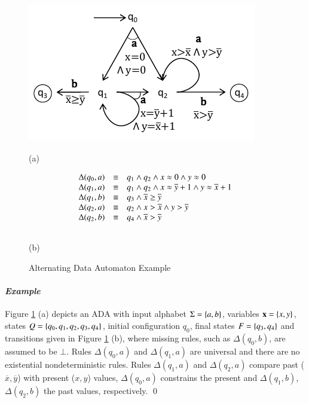 \documentclass[10pt]{llncs}
\begin{document}
\begin{figure}[htb]
\begin{center}
\begin{minipage}{6cm}
\centerline{\includegraphics[scale=0.8]{Example.pdf}}
\centerline{(a)}
\end{minipage}
\begin{minipage}{6cm}
\[\begin{array}{rcl}
\Delta(q_0,a) & \equiv & q_1 \wedge q_2 \wedge x\approx0 \wedge y\approx0 \\
\Delta(q_1,a) & \equiv & q_1 \wedge q_2 \wedge x\approx\overline{y}+1 \wedge y\approx\overline{x}+1 \\
\Delta(q_1,b) & \equiv & q_3 \wedge \overline{x} \geq \overline{y} \\
\Delta(q_2,a) & \equiv & q_2 \wedge x > \overline{x} \wedge y > \overline{y} \\
\Delta(q_2,b) & \equiv & q_4 \wedge \overline{x}>\overline{y} \\\\
\end{array}\]
\centerline{(b)}
\end{minipage}
\end{center}
\caption{Alternating Data Automaton Example}
\label{fig:ex}
\end{figure}

\paragraph{\em Example}
Figure \ref{fig:ex} (a) depicts an ADA with input alphabet $\Sigma =
\left\{ a,b \right\}$, variables $\mathbf x = \left\{ x,y \right\}$, states $Q =
\left\{ q_0,q_1,q_2,q_3,q_4 \right\}$, initial configuration $q_0$, final states
$F=\left\{ q_3,q_4 \right\}$ and transitions given in Figure \ref{fig:ex} (b),
where missing rules, such as $\Delta(q_0,b)$, are assumed to be
$\bot$. Rules $\Delta(q_0,a)$ and $\Delta(q_1,a)$ are universal and
there are no existential nondeterministic rules. Rules $\Delta(q_1,a)$
and $\Delta(q_2,a)$ compare past ($\overline{x},\overline{y}$) with
present ($x,y$) values, $\Delta(q_0,a)$ constrains the present and
$\Delta(q_1,b)$, $\Delta(q_2,b)$ the past values, respectively. \qed
\end{document}
